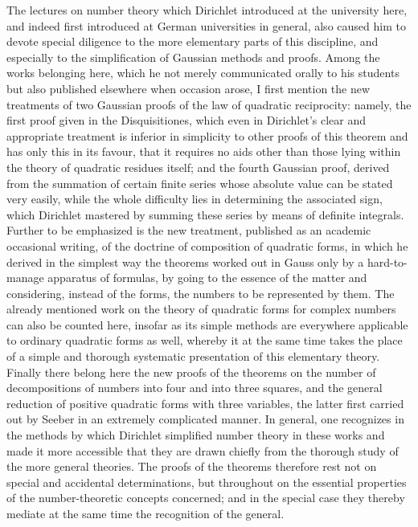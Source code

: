 \documentclass[11pt]{article}
\begin{document}
The lectures on number theory which Dirichlet introduced at the university here, and indeed first introduced at German universities in general, also caused him to devote special diligence to the more elementary parts of this discipline, and especially to the simplification of Gaussian methods and proofs. Among the works belonging here, which he not merely communicated orally to his students but also published elsewhere when occasion arose, I first mention the new treatments of two Gaussian proofs of the law of quadratic reciprocity: namely, the first proof given in the Disquisitiones, which even in Dirichlet's clear and appropriate treatment is inferior in simplicity to other proofs of this theorem and has only this in its favour, that it requires no aids other than those lying within the theory of quadratic residues itself; and the fourth Gaussian proof, derived from the summation of certain finite series whose absolute value can be stated very easily, while the whole difficulty lies in determining the associated sign, which Dirichlet mastered by summing these series by means of definite integrals. Further to be emphasized is the new treatment, published as an academic occasional writing, of the doctrine of composition of quadratic forms, in which he derived in the simplest way the theorems worked out in Gauss only by a hard-to-manage apparatus of formulas, by going to the essence of the matter and considering, instead of the forms, the numbers to be represented by them. The already mentioned work on the theory of quadratic forms for complex numbers can also be counted here, insofar as its simple methods are everywhere applicable to ordinary quadratic forms as well, whereby it at the same time takes the place of a simple and thorough systematic presentation of this elementary theory. Finally there belong here the new proofs of the theorems on the number of decompositions of numbers into four and into three squares, and the general reduction of positive quadratic forms with three variables, the latter first carried out by Seeber in an extremely complicated manner. In general, one recognizes in the methods by which Dirichlet simplified number theory in these works and made it more accessible that they are drawn chiefly from the thorough study of the more general theories. The proofs of the theorems therefore rest not on special and accidental determinations, but throughout on the essential properties of the number-theoretic concepts concerned; and in the special case they thereby mediate at the same time the recognition of the general.
\end{document}
